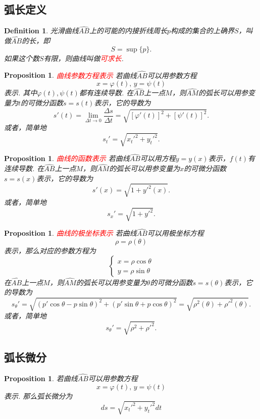 \documentclass{article}
\newtheorem{proposition}[theorem]{Proposition}
\newtheorem{definition}[theorem]{Definition}
\newcommand{\redt}[1]{\textcolor{red}{#1}}
\begin{document}
\subsection{弧长定义}

\begin{definition}
\rm 光滑曲线$\widehat{AB}$上的可能的内接折线周长$p$构成的集合的上确界$S$，叫做$\widehat{AB}$的长，即
$$
S = \sup\{p\}.
$$
如果这个数$S$有限，则曲线叫做\redt{可求长}.
\end{definition}

\begin{proposition}
\rm \redt{曲线参数方程表示} 若曲线$\widehat{AB}$可以用参数方程
$$
x = \varphi(t), \, y = \psi(t) 
$$
表示. 其中$\varphi(t),\psi(t)$都有连续导数. 在$\widehat{AB}$上一点$M$，则$\widehat{AM}$的弧长可以用参变量为$t$的可微分函数$s = s(t)$表示，它的导数为
$$
s'(t) = \lim\limits_{\Delta t \to 0}\frac{\Delta s}{\Delta t} = \sqrt{[\varphi'(t)]^2+[\psi'(t)]^2}.
$$
或者，简单地
$$
s_t' = \sqrt{x_t'^2 + y_t'^2}. 
$$
\end{proposition}

\begin{proposition}
\rm \redt{曲线的函数表示} 若曲线$\widehat{AB}$可以用方程$y=y(x)$表示，$f(t)$有连续导数. 在$\widehat{AB}$上一点$M$，则$\widehat{AM}$的弧长可以用参变量为$x$的可微分函数$s = s(x)$表示，它的导数为
$$
s'(x) = \sqrt{1+y'^2(x)}. 
$$
或者，简单地
$$
s_x' = \sqrt{1+y'^2}.
$$
\end{proposition}

\begin{proposition}
\rm \redt{曲线的极坐标表示} 若曲线$\widehat{AB}$可以用极坐标方程
$$
\rho = \rho(\theta)
$$
表示，那么对应的参数方程为
$$
\left \{
\begin{array}{ll}
x = \rho\cos\theta \\
y = \rho\sin\theta
\end{array} \right.
$$
在$\widehat{AB}$上一点$M$，则$\widehat{AM}$的弧长可以用参变量为$\theta$的可微分函数$s = s(\theta)$表示，它的导数为
$$
s_\theta' = \sqrt{(p'\cos\theta-p\sin\theta)^2 +(p'\sin\theta+p\cos\theta)^2} = \sqrt{\rho^2(\theta) + \rho'^2(\theta)}.
$$
或者，简单地
$$
s_\theta' = \sqrt{\rho^2 + \rho'^2}. 
$$
\end{proposition}

\subsection{弧长微分}

\begin{proposition}
\rm 若曲线$\widehat{AB}$可以用参数方程
$$
x = \varphi(t), \, y = \psi(t) 
$$
表示. 那么弧长微分为
$$
ds = \sqrt{x_t'^2 + y_t'^2}dt
$$
\end{proposition}
\end{document}
